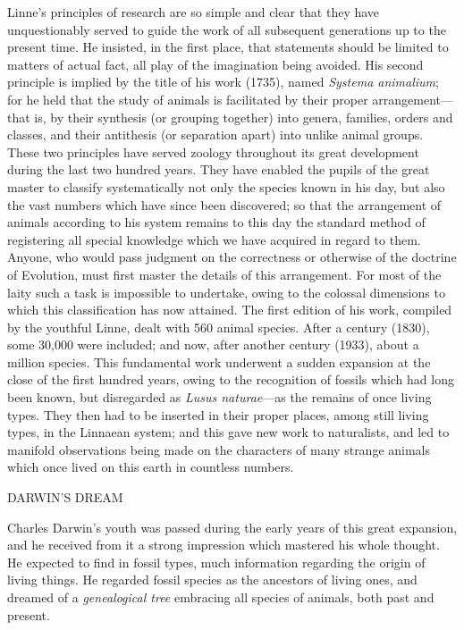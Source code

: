 Linne's principles of research are so simple and clear that they have unquestionably served to
guide the work of all subsequent generations up to the present time. He insisted, in the first
place, that statements should be limited to matters of actual fact, all play of the imagination
being avoided. His second principle is implied by the title of his work (1735), named
\textit{Systema animalium}; for he held that the study of animals is facilitated by their proper
arrangement—that is, by their synthesis (or grouping together) into genera, families, orders
and classes, and their antithesis (or separation apart) into unlike animal groups. These two
principles have served zoology throughout its great development during the last two hundred
years. They have enabled the pupils of the great master to classify systematically not only the
species known in his day, but also the vast numbers which have since been discovered; so
that the arrangement of animals according to his system remains to this day the standard
method of registering all special knowledge which we have acquired in regard to them.
Anyone, who would pass judgment on the correctness or otherwise of the doctrine of
Evolution, must first master the details of this arrangement. For most of the laity such a task
is impossible to undertake, owing to the colossal dimensions to which this classification has
now attained. The first edition of his work, compiled by the youthful Linne, dealt with 560
animal species. After a century (1830), some 30,000 were included; and now, after another
century (1933), about a million species. This fundamental work underwent a sudden
expansion at the close of the first hundred years, owing to the recognition of fossils which
had long been known, but disregarded as \textit{Lusus naturae}—as the remains of once living types.
They then had to be inserted in their proper places, among still living types, in the Linnaean
system; and this gave new work to naturalists, and led to manifold observations being made
on the characters of many strange animals which once lived on this earth in countless
numbers.

DARWIN'S DREAM

Charles Darwin's youth was passed during the early years of this great expansion, and he
received from it a strong impression which mastered his whole thought. He expected to find
in fossil types, much information regarding the origin of living things. He regarded fossil
species as the ancestors of living ones, and dreamed of a \textit{genealogical tree} embracing all
species of animals, both past and present.

